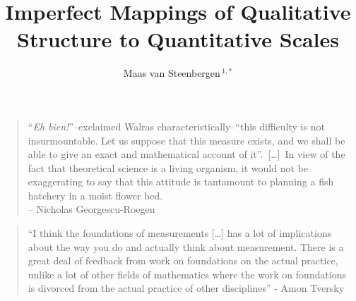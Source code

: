 \documentclass[utf8]{FrontiersinVancouver}
\def\firstAuthorLast{van Steenbergen} %
\def\Authors{Maas van Steenbergen\,$^{1,*}$}
\begin{document}
\onecolumn
{}

\title[]{Imperfect Mappings of Qualitative Structure to Quantitative Scales} 

\author[\firstAuthorLast]{\Authors} %
\address{} %
\correspondance{} %

\extraAuth{}%

\maketitle


\begin{quote}
    ``\textit{Eh bien!}''--exclaimed Walras characteristically--``this difficulty is not insurmountable. Let us suppose that this measure exists, and we shall be able to give an exact and mathematical account of it''.\ 
    [\dots]\ In view of the fact that theoretical science is a living organism, it would not be exaggerating to say that this attitude is tantamount to planning a fish hatchery in a moist flower bed.\\
    -- Nicholas Georgescu-Roegen

\end{quote}
\begin{quote}
    ``I think the foundations of measurements [\ldots] has a lot of implications about the way you do and actually think about measurement. There is a great deal of feedback from work on foundations on the actual practice, unlike a lot of other fields of mathematics where the work on foundations is divorced from the actual practice of other disciplines''
    - Amon Tversky
\end{quote}
\end{document}
